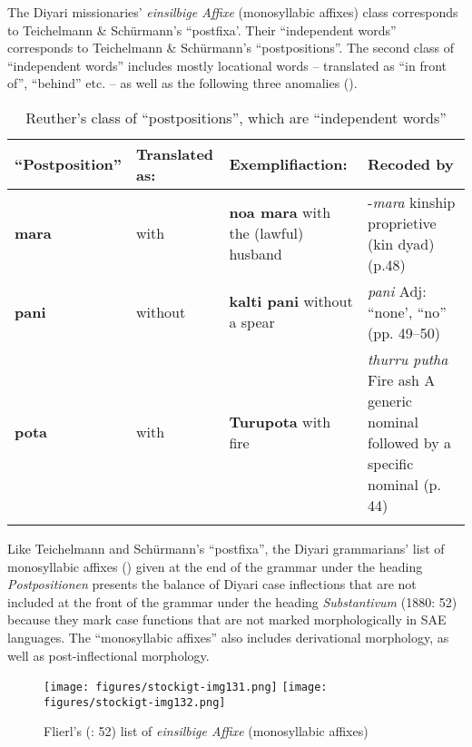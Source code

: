 The Diyari missionaries' \textit{einsilbige Affixe} (monosyllabic affixes) class corresponds to Teichelmann \& Schürmann’s “postfixa’. Their “independent words” corresponds to Teichelmann \& Schürmann’s ``postpositions''. The second class of “independent words” includes mostly locational words – translated as “in front of'', “behind” etc. – as well as the following three anomalies ().


\begin{table}
\begin{tabularx}{\textwidth}{llQQ}
\lsptoprule
\textbf{``Postposition''}
& Translated as: & Exemplifiaction:  & Recoded by \citet{Austin2013} \\
\midrule
\textbf{mara}
 & with & \textbf{noa mara} with the (lawful) husband & {}-\textit{mara} kinship proprietive (kin dyad) (p.48) \\
\textbf{pani} & without & \textbf{kalti pani} without a spear & \textit{pani} Adj: “none’, “no” (pp. 49--50) \\
\textbf{pota} & with & \textbf{Turupota} with fire & \textit{thurru putha} Fire ash A generic nominal followed by a specific nominal (p. 44) \\
\lspbottomrule
\end{tabularx}
\caption{Reuther's class of “postpositions'', which are ``independent words''}
\label{bkm:Ref449372358}
\label{fig:key:8-182}
\end{table}

Like Teichelmann and Schürmann’s “postfixa'', the Diyari grammarians' list of monosyllabic affixes () given at the end of the grammar under the heading \textit{Postpositionen} presents the balance of Diyari case inflections that are not included at the front of the grammar under the heading \textit{Substantivum} (1880: 52) because they mark case functions that are not marked morphologically in SAE languages. The “monosyllabic affixes” also includes derivational morphology, as well as post-inflectional morphology.


\begin{figure}
\texttt{[image: figures/stockigt-img131.png]}
\texttt{[image: figures/stockigt-img132.png]}
\caption{Flierl’s (\citeyear{Flierl1880}: 52) list of \textit{einsilbige Affixe} (monosyllabic affixes)}
\label{bkm:Ref449372478}\label{fig:key:8-183}
\end{figure}

